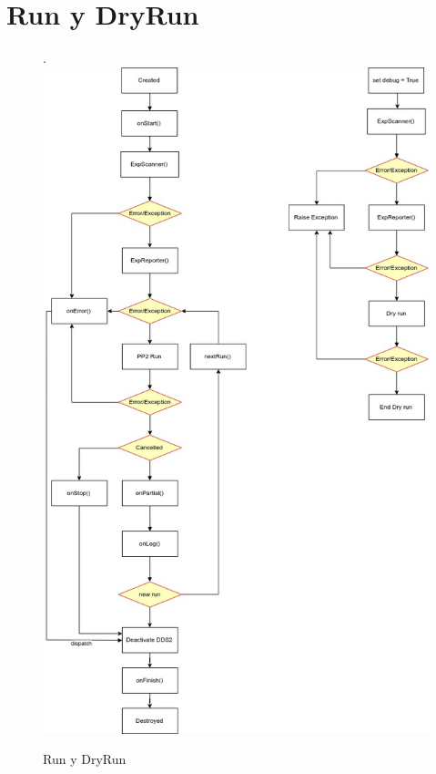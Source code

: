 \section{Run y DryRun}
\begin{figure}[!htb].
    \includegraphics[width=\linewidth]{../figures/d15a.jpg}
    \caption{Run y DryRun}
    \label{fig:d15a}
\end{figure}
\newpage